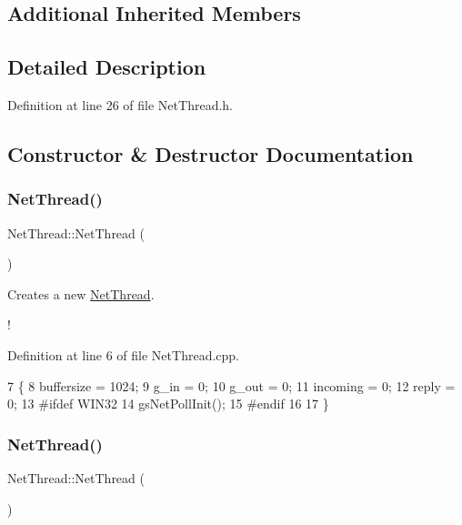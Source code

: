 \subsection*{Additional Inherited Members}


\subsection{Detailed Description}


Definition at line 26 of file Net\+Thread.\+h.



\subsection{Constructor \& Destructor Documentation}
\mbox{\label{class_net_thread_a4020c297c2b25730e046ce1a3608510f}} 
\subsubsection{\texorpdfstring{Net\+Thread()}{NetThread()}\hspace{0.1cm}{\footnotesize\ttfamily [1/2]}}
{\footnotesize\ttfamily Net\+Thread\+::\+Net\+Thread (\begin{DoxyParamCaption}{ }\end{DoxyParamCaption})}



Creates a new \hyperlink{class_net_thread}{Net\+Thread}. 

! 

Definition at line 6 of file Net\+Thread.\+cpp.


\begin{DoxyCode}
7 \{
8     buffersize = 1024;
9     g\_in = 0;
10     g\_out = 0;
11     incoming = 0;
12     reply = 0;
13 \textcolor{preprocessor}{#ifdef WIN32}
14     gsNetPollInit();
15 \textcolor{preprocessor}{#endif}
16 
17 \}
\end{DoxyCode}
\mbox{\label{class_net_thread_a4020c297c2b25730e046ce1a3608510f}} 
\subsubsection{\texorpdfstring{Net\+Thread()}{NetThread()}\hspace{0.1cm}{\footnotesize\ttfamily [2/2]}}
{\footnotesize\ttfamily Net\+Thread\+::\+Net\+Thread (\begin{DoxyParamCaption}{ }\end{DoxyParamCaption})}



